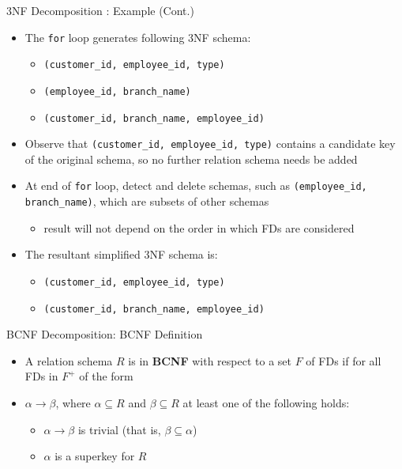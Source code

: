 \documentclass[aspectratio=169, xcolor=dvipsnames]{beamer}
\begin{document}
\begin{frame}{3NF Decomposition : Example (Cont.)}
    \begin{itemize}[<+->]
        \item The \texttt{for} loop generates following 3NF schema:
        \begin{itemize}
            \item[$\triangleright$] \texttt{(customer\_id, employee\_id, type)}
            \item[$\triangleright$] \texttt{(employee\_id, branch\_name)}
            \item[$\triangleright$] \texttt{(customer\_id, branch\_name, employee\_id)}
        \end{itemize}
        \item Observe that \texttt{(customer\_id, employee\_id, type)} contains a candidate key of the original schema, so no further relation schema needs be added
        \item At end of \texttt{for} loop, detect and delete schemas, such as \texttt{(employee\_id, branch\_name)}, which are subsets of other schemas
        \begin{itemize}
            \item[$\triangleright$] result will not depend on the order in which FDs are considered
        \end{itemize}
        \item The resultant simplified 3NF schema is:
        \begin{itemize}
            \item[$\triangleright$] \texttt{(customer\_id, employee\_id, type)}
            \item[$\triangleright$] \texttt{(customer\_id, branch\_name, employee\_id)}
        \end{itemize}
    \end{itemize}
\end{frame}

\begin{frame}{BCNF Decomposition: BCNF Definition}
    \begin{itemize}[<+->]
        \item A relation schema $R$ is in \textbf{BCNF} with respect to a set $F$ of FDs if for all FDs in $F^+$ of the form
        \item $\alpha \rightarrow \beta$, where $\alpha \subseteq R$ and $\beta \subseteq R$ at least one of the following holds:
        \begin{itemize}
            \item[$\triangleright$] $\alpha \rightarrow \beta$ is trivial (that is, $\beta \subseteq \alpha$)
            \item[$\triangleright$] $\alpha$ is a superkey for $R$
        \end{itemize}
    \end{itemize}
\end{frame}
\end{document}

